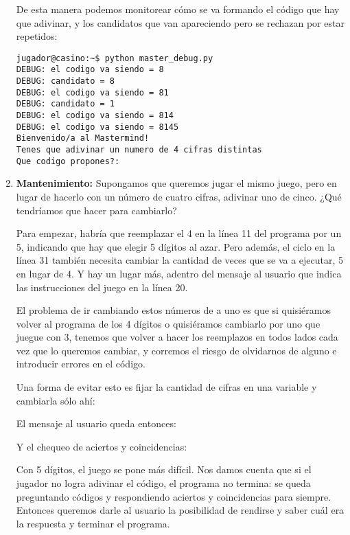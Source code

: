 \begin{enumerate}


De esta manera podemos monitorear cómo se va formando el código que hay que
adivinar, y los candidatos que van apareciendo pero se rechazan por estar
repetidos:

\begin{verbatim}
jugador@casino:~$ python master_debug.py
DEBUG: el codigo va siendo = 8
DEBUG: candidato = 8
DEBUG: el codigo va siendo = 81
DEBUG: candidato = 1
DEBUG: el codigo va siendo = 814
DEBUG: el codigo va siendo = 8145
Bienvenido/a al Mastermind!
Tenes que adivinar un numero de 4 cifras distintas
Que codigo propones?:
\end{verbatim}

\item {\bf Mantenimiento:}
\label{str:mant}
Supongamos que queremos jugar el mismo juego, pero en lugar de hacerlo con un
número de cuatro cifras, adivinar uno de cinco. ¿Qué tendríamos que hacer para
cambiarlo?

Para empezar, habría que reemplazar el 4 en la línea 11 del programa por un
5, indicando que hay que elegir 5 dígitos al azar. Pero además, el ciclo en la
línea 31 también necesita cambiar la cantidad de veces que se va a ejecutar, 5
en lugar de 4. Y hay un lugar más, adentro del mensaje al usuario que indica las
instrucciones del juego en la línea 20.

El problema de ir cambiando estos números de a uno es que si quisiéramos volver
al programa de los 4 dígitos o quisiéramos cambiarlo por uno que juegue con 3,
tenemos que volver a hacer los reemplazos en todos lados cada vez que lo
queremos cambiar, y corremos el riesgo de olvidarnos de alguno e introducir
errores en el código.

Una forma de evitar esto es fijar la cantidad de cifras en una variable y
cambiarla sólo ahí:


El mensaje al usuario queda entonces:



Y el chequeo de aciertos y coincidencias:



Con 5 dígitos, el juego se pone más difícil. Nos damos cuenta que si el jugador
no logra adivinar el código, el programa no termina: se queda preguntando
códigos y respondiendo aciertos y coincidencias para siempre. Entonces queremos
darle al usuario la posibilidad de rendirse y saber cuál era la respuesta y
terminar el programa.


\end{enumerate}
